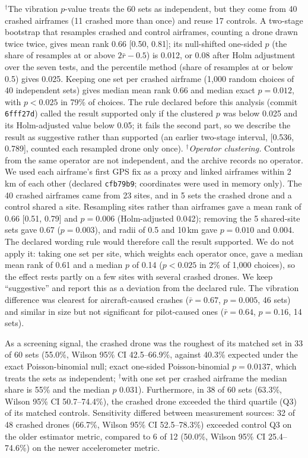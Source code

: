 \documentclass[preprint,12pt]{elsarticle}
\begin{document}
$^\dagger$The vibration $p$-value treats the 60 sets as independent, but they come from 40 crashed airframes (11 crashed more than once) and reuse 17 controls. A two-stage bootstrap that resamples crashed and control airframes, counting a drone drawn twice twice, gives mean rank 0.66 [0.50, 0.81]; its null-shifted one-sided $p$ (the share of resamples at or above $2\bar r - 0.5$) is 0.012, or 0.08 after Holm adjustment over the seven tests, and the percentile method (share of resamples at or below 0.5) gives 0.025. Keeping one set per crashed airframe (1,000 random choices of 40 independent sets) gives median mean rank 0.66 and median exact $p=0.012$, with $p<0.025$ in 79\% of choices. The rule declared before this analysis (commit \texttt{6fff27d}) called the result supported only if the clustered $p$ was below 0.025 and its Holm-adjusted value below 0.05; it fails the second part, so we describe the result as suggestive rather than supported (an earlier two-stage interval, [0.536, 0.789], counted each resampled drone only once). $^\dagger$\emph{Operator clustering.} Controls from the same operator are not independent, and the archive records no operator. We used each airframe's first GPS fix as a proxy and linked airframes within 2\,km of each other (declared \texttt{cfb79b9}; coordinates were used in memory only). The 40 crashed airframes came from 23 sites, and in 5 sets the crashed drone and a control shared a site. Resampling sites rather than airframes gave a mean rank of 0.66 [0.51, 0.79] and $p=0.006$ (Holm-adjusted 0.042); removing the 5 shared-site sets gave 0.67 ($p=0.003$), and radii of 0.5 and 10\,km gave $p=0.010$ and 0.004. The declared wording rule would therefore call the result supported. We do not apply it: taking one set per site, which weights each operator once, gave a median mean rank of 0.61 and a median $p$ of 0.14 ($p<0.025$ in 2\% of 1,000 choices), so the effect rests partly on a few sites with several crashed drones. We keep ``suggestive'' and report this as a deviation from the declared rule. The vibration difference was clearest for aircraft-caused crashes
($\bar r=0.67$, $p=0.005$, 46 sets) and similar in size but not significant for pilot-caused ones ($\bar r=0.64$, $p=0.16$,
14 sets).

As a screening signal, the crashed drone was the roughest of its matched set in 33 of 60 sets (55.0\%, Wilson 95\% CI
42.5--66.9\%, against 40.3\% expected under the exact Poisson-binomial null; exact one-sided Poisson-binomial $p=0.0137$, which treats the sets as independent; $^\dagger$with one set per crashed airframe the median share is 55\% and the median $p$ 0.031).
Furthermore, in 38 of 60 sets (63.3\%, Wilson 95\% CI 50.7--74.4\%), the crashed drone exceeded the third quartile (Q3) of
its matched controls. Sensitivity differed between measurement sources: 32 of 48 crashed drones (66.7\%, Wilson 95\% CI
52.5--78.3\%) exceeded control Q3 on the older estimator metric, compared to 6 of 12 (50.0\%, Wilson 95\% CI 25.4--74.6\%)
on the newer accelerometer metric.
\end{document}
